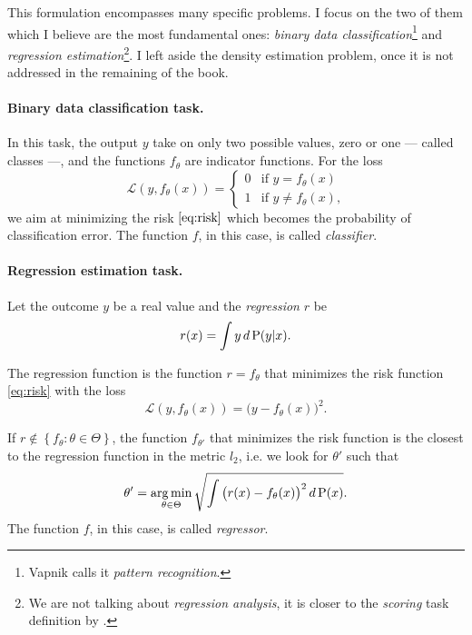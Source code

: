 This formulation encompasses many specific problems. I focus on the two of them which I
believe are the most fundamental ones: \emph{binary data classification}\footnote{Vapnik
calls it \emph{pattern recognition}.} and \emph{regression estimation}\footnote{We are not
talking about \emph{regression analysis}, it is closer to the \emph{scoring} task
definition by \textcite{Zumel2019}.}.  I left aside the density estimation problem, once
it is not
addressed in the remaining of the book.

\paragraph{Binary data classification task.}  In this task, the output $y$ take on
only two possible values, zero or one --- called classes ---, and the functions $f_\theta$ are indicator
functions. For the loss
\begin{equation*}
  \mathcal{L}(y, f_\theta(x)) = \begin{cases}
    0 & \text{if } y = f_\theta(x) \\
    1 & \text{if } y \neq f_\theta(x)\text{,}
  \end{cases}
\end{equation*}
we aim at minimizing the risk $\eqref{eq:risk}$ which becomes the probability of
classification error.  The function $f$, in this case, is called \emph{classifier}.

\paragraph{Regression estimation task.} Let the outcome $y$ be a real value and
the \emph{regression} $r$ be $$r(x) = \int y\, d\operatorname{P}(y|x) \text{.}$$

The regression function is the function $r = f_\theta$ that minimizes the risk function
\eqref{eq:risk} with the loss
\begin{equation*}
  \mathcal{L}(y, f_\theta(x)) = \big(y - f_\theta(x)\big)^2\text{.}
\end{equation*}

If $r \not\in \left\{ f_\theta : \theta\in\Theta \right\}$, the function $f_{\theta'}$
that minimizes the risk function is the closest to the regression function in the
metric $l_2$, i.e. we look for $\theta'$ such that
\begin{equation*}
  \theta' = \operatorname*{arg\,min}_{\theta \in \Theta} \sqrt{
    \int \big(r(x) - f_\theta(x)\big)^2\, d\operatorname{P}(x)
  }\text{.}
\end{equation*}
The function $f$, in this case, is called \emph{regressor}.


